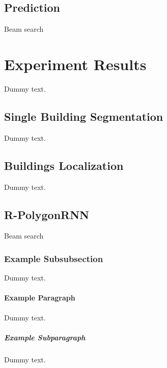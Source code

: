 \subsection{Prediction}

Beam search

\section{Experiment Results}\label{expres}

Dummy text.

\subsection{Single Building Segmentation}

Dummy text.

\subsection{Buildings Localization}

Dummy text.

\subsection{R-PolygonRNN}

Beam search


\subsubsection{Example Subsubsection}

Dummy text.

\paragraph{Example Paragraph}

Dummy text.

\subparagraph{Example Subparagraph}

Dummy text.

